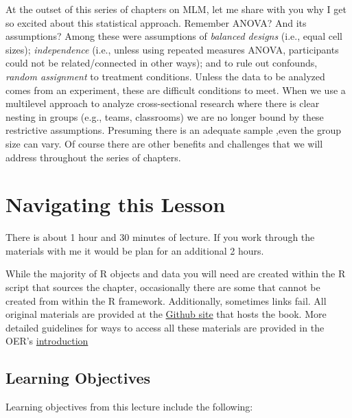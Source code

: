 \documentclass[
  11pt,
]{book}
\begin{document}
At the outset of this series of chapters on MLM, let me share with you why I get so excited about this statistical approach. Remember ANOVA? And its assumptions? Among these were assumptions of \emph{balanced designs} (i.e., equal cell sizes); \emph{independence} (i.e., unless using repeated measures ANOVA, participants could not be related/connected in other ways); and to rule out confounds, \emph{random assignment} to treatment conditions. Unless the data to be analyzed comes from an experiment, these are difficult conditions to meet. When we use a multilevel approach to analyze cross-sectional research where there is clear nesting in groups (e.g., teams, classrooms) we are no longer bound by these restrictive assumptions. Presuming there is an adequate sample \citep[ suggested a minimum of 10 clusters with 5 members each]{bell_how_2014},even the group size can vary. Of course there are other benefits and challenges that we will address throughout the series of chapters.

\hypertarget{navigating-this-lesson}{%
\section{Navigating this Lesson}\label{navigating-this-lesson}}

There is about 1 hour and 30 minutes of lecture. If you work through the materials with me it would be plan for an additional 2 hours.

While the majority of R objects and data you will need are created within the R script that sources the chapter, occasionally there are some that cannot be created from within the R framework. Additionally, sometimes links fail. All original materials are provided at the \href{https://github.com/lhbikos/ReC_CPA}{Github site} that hosts the book. More detailed guidelines for ways to access all these materials are provided in the OER's \protect\hyperlink{ReCintro}{introduction}

\hypertarget{learning-objectives}{%
\subsection{Learning Objectives}\label{learning-objectives}}

Learning objectives from this lecture include the following:
\end{document}
